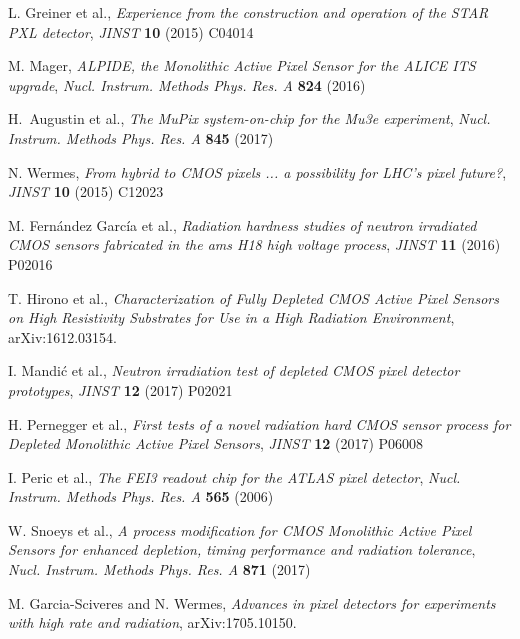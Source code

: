 \documentclass[a4paper,11pt]{article}
\begin{document}
\begin{thebibliography}{99}

L. Greiner et al., \emph{Experience from the construction and operation of the STAR PXL detector}, \emph{JINST} {\bf 10} (2015) C04014

M. Mager, \emph{ALPIDE, the Monolithic Active Pixel Sensor for the ALICE ITS upgrade}, \emph{Nucl. Instrum. Methods Phys. Res. A} {\bf 824} (2016)

H.~Augustin et al., \emph{The MuPix system-on-chip for the Mu3e experiment}, \emph{Nucl. Instrum. Methods Phys. Res. A} {\bf 845} (2017) 

N. Wermes, \emph{From hybrid to CMOS pixels ... a possibility for LHC's pixel future?}, \emph{JINST} {\bf 10} (2015) C12023

M. Fern\'{a}ndez Garc\'{i}a et al., \emph{Radiation hardness studies of neutron irradiated CMOS sensors fabricated in the ams H18 high voltage process}, \emph{JINST} {\bf 11} (2016) P02016

T. Hirono et al., \emph{Characterization of Fully Depleted CMOS Active Pixel Sensors on High Resistivity Substrates for Use in a High Radiation Environment},
arXiv:1612.03154.

I. Mandi\'{c} et al., \emph{Neutron irradiation test of depleted CMOS pixel detector prototypes}, \emph{JINST} {\bf 12} (2017) P02021

H. Pernegger et al., \emph{First tests of a novel radiation hard CMOS sensor process for Depleted Monolithic Active Pixel Sensors}, \emph{JINST} {\bf 12} (2017) P06008

I. Peric et al., \emph{The FEI3 readout chip for the ATLAS pixel detector}, \emph{Nucl. Instrum. Methods Phys. Res. A} {\bf 565} (2006)

W. Snoeys et al., \emph{A process modification for CMOS Monolithic Active Pixel Sensors for enhanced depletion, timing performance and radiation tolerance}, \emph{Nucl. Instrum. Methods Phys. Res. A} {\bf 871} (2017)

M. Garcia-Sciveres and N. Wermes, \emph{Advances in pixel detectors for experiments with high rate and radiation},
arXiv:1705.10150.


\end{thebibliography}
\end{document}
